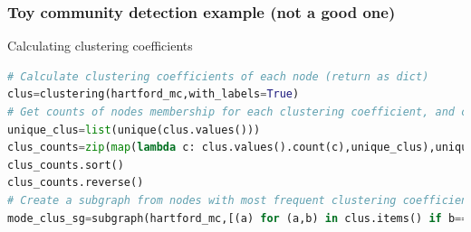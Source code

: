 \documentclass[xcolor=dvipsnames, 9pt]{beamer}
\begin{document}
\begin{frame}[fragile]
    \frametitle{Toy community detection example (not a good one)}
    \begin{block}{Calculating clustering coefficients}
        \scriptsize{\begin{lstlisting}[language=Python]
# Calculate clustering coefficients of each node (return as dict)
clus=clustering(hartford_mc,with_labels=True)
# Get counts of nodes membership for each clustering coefficient, and clean up
unique_clus=list(unique(clus.values()))
clus_counts=zip(map(lambda c: clus.values().count(c),unique_clus),unique_clus)
clus_counts.sort()
clus_counts.reverse()
# Create a subgraph from nodes with most frequent clustering coefficient
mode_clus_sg=subgraph(hartford_mc,[(a) for (a,b) in clus.items() if b==clus_counts[0][1]])       
        \end{lstlisting}}
    \end{block}
    \begin{columns}
        \begin{itemize}
        \end{itemize}
            \begin{center}
            \end{center}
    \end{columns}
    \begin{center}
    \end{center}
\end{frame}


\end{document}
